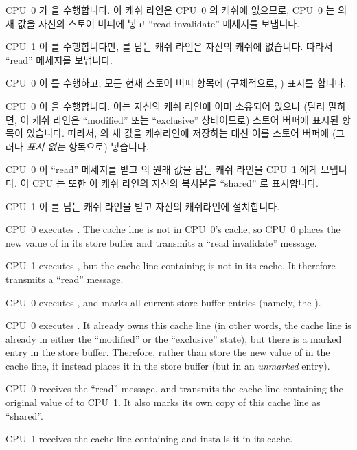\begin{sequence}
\item	CPU~0 가  을 수행합니다.  이 캐쉬 라인은 CPU~0 의 캐쉬에
	없으므로, CPU~0 는  의 새 값을 자신의 스토어 버퍼에 넣고 ``read
	invalidate'' 메세지를 보냅니다.
\item	CPU~1 이  를 수행합니다만,  를 담는
	캐쉬 라인은 자신의 캐쉬에 없습니다.
	따라서 ``read'' 메세지를 보냅니다.
\item	CPU~0 이  를 수행하고, 모든 현재 스토어 버퍼 항목에
	(구체적으로, ) 표시를 합니다.
\item	CPU~0 이  을 수행합니다.
	이는 자신의 캐쉬 라인에 이미 소유되어 있으나 (달리 말하면, 이 캐쉬
	라인은 ``modified'' 또는 ``exclusive'' 상태이므로) 스토어 버퍼에 표시된
	항목이 있습니다.
	따라서,  의 새 값을 캐쉬라인에 저장하는 대신 이를 스토어 버퍼에
	(그러나 \emph{표시 없는} 항목으로) 넣습니다.
\item	CPU~0 이 ``read'' 메세지를 받고  의 원래 값을 담는 캐쉬 라인을
	CPU~1 에게 보냅니다.
	이 CPU 는 또한 이 캐쉬 라인의 자신의 복사본을 ``shared'' 로 표시합니다.
\item	CPU~1 이  를 담는 캐쉬 라인을 받고 자신의 캐쉬라인에 설치합니다.

\iffalse

\item	CPU~0 executes .  The cache line is not in
	CPU~0's cache, so CPU~0 places the new value of  in its
	store buffer and transmits a ``read invalidate'' message.
\item	CPU~1 executes , but the cache line
	containing  is not in its cache.
	It therefore transmits a ``read'' message.
\item	CPU~0 executes , and marks all current store-buffer
	entries (namely, the ).
\item	CPU~0 executes .
	It already owns this cache line (in other words, the cache line
	is already in either the ``modified'' or the ``exclusive'' state),
	but there is a marked entry in the store buffer.
	Therefore, rather than store the new value of  in the
	cache line, it instead places it in the store buffer (but
	in an \emph{unmarked} entry).
\item	CPU~0 receives the ``read'' message, and transmits the
	cache line containing the original value of 
	to CPU~1.
	It also marks its own copy of this cache line as ``shared''.
\item	CPU~1 receives the cache line containing  and installs
	it in its cache.


\end{sequence}
